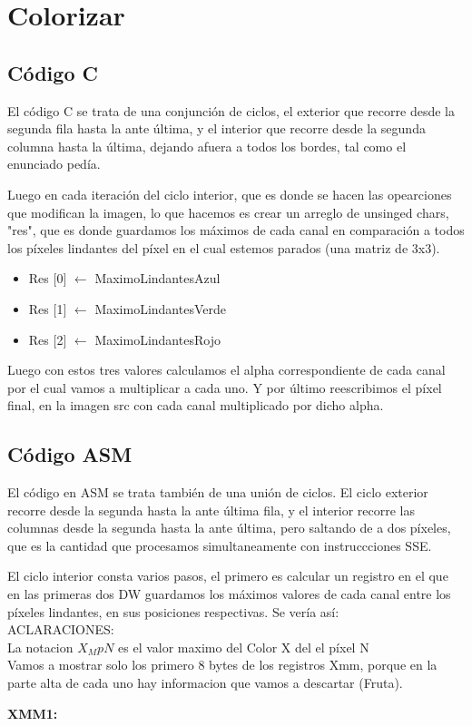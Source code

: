 \section{Colorizar}

\subsection{Código C}
\par{El código C se trata de una conjunción de ciclos, el exterior que recorre desde la segunda fila hasta la ante última,  y el interior que recorre desde la segunda columna hasta la última, dejando afuera a todos los bordes, tal como el enunciado pedía.}
\par{Luego en cada iteración del ciclo interior, que es donde se hacen las opearciones que modifican la imagen, lo que hacemos es crear un arreglo de unsinged chars, "res", que es  donde guardamos los máximos de cada canal en comparación a todos  los píxeles lindantes del píxel en el cual estemos parados (una matriz de 3x3).}
\begin{itemize}
\item {Res $[$0$]$ $\leftarrow$ MaximoLindantesAzul}
\item {Res $[$1$]$ $\leftarrow$ MaximoLindantesVerde}
\item {Res $[$2$]$ $\leftarrow$ MaximoLindantesRojo}
\end{itemize}
\par{Luego con estos tres valores calculamos el alpha correspondiente de cada canal por el cual vamos a multiplicar a cada uno. Y por último reescribimos el píxel final, en la imagen src con cada canal multiplicado por dicho alpha.}

\subsection{Código ASM}
\par{El código en ASM se trata también de una unión de ciclos. El ciclo exterior recorre desde la segunda hasta la ante última fila, y el interior recorre las columnas desde la segunda hasta la ante última, pero saltando de a dos píxeles, que es la cantidad que procesamos simultaneamente con instruccciones SSE.}
\par{El ciclo interior consta varios pasos, el primero es calcular un registro en el que en las primeras dos DW guardamos los máximos valores de cada canal entre los píxeles lindantes, en sus posiciones respectivas. Se vería así:}
\\ACLARACIONES: 
\\ \hspace{3cm} La notacion $X_M{pN}$ es el valor maximo del Color X del el píxel N
\\ \hspace{3cm} Vamos a mostrar solo los primero 8 bytes de los registros Xmm, porque en la parte alta de cada uno hay informacion que vamos a descartar (Fruta).
\par{\textbf{XMM1:}}
	
